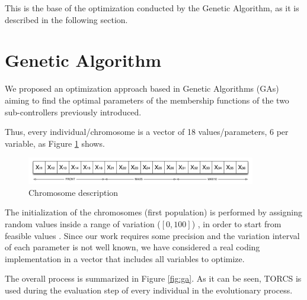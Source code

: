 \documentclass[10pt,journal,compsoc]{IEEEtran}
\begin{document}
This is the base of the optimization conducted by the Genetic Algorithm, as it is described in the following section.



\section{Genetic Algorithm}
\label{sec:GA_optimization}

We proposed an optimization approach based in Genetic Algorithms (GAs) \cite{GAs_Goldberg89} aiming to find the optimal parameters of the membership functions of the two sub-controllers previously introduced. 

Thus, every individual/chromosome is a vector of 18 values/parameters, 6 per variable, as Figure \ref {fig:cromosome} shows.

\begin{figure}[!ht]	
	\begin{center}
		\includegraphics[width=10cm]{fig/chromosome2.png}
		\caption{Chromosome description}
		\label{fig:cromosome}	
	\end{center}	
\end{figure}

The initialization of the chromosomes (first population) is performed by assigning random values inside a range of variation ($[0,100]$)
\cite{GAs_Goldberg89}, in order to start from feasible values
\cite{salem_evo17}. Since our work requires some precision and the variation interval of each parameter is not well known, we have considered a real coding
implementation \cite{elsayed13} in a vector that includes all variables to optimize.

The overall process is summarized in Figure \ref{fig:ga}. As it can be seen, TORCS is used during the evaluation step of every individual in the evolutionary process.
\end{document}
